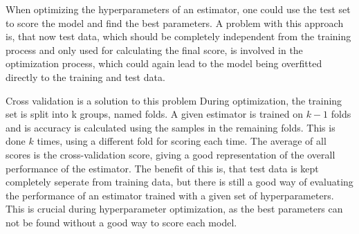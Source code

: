 When optimizing the hyperparameters of an estimator, one could use the test set to score
the model and find the best parameters. A problem with this approach is, that now test data,
which should be completely independent from the training process and only used for calculating
the final score, is involved in the optimization process, which could again lead to the model being
overfitted directly to the training and test data.

Cross validation is a solution to this problem During optimization, the training set is
split into k groups, named folds. A given estimator is trained on $k-1$ folds and is accuracy
is calculated using the samples in the remaining folds. This is done $k$ times, using a different fold
for scoring each time. The average of all scores is the cross-validation score, giving a good
representation of the overall performance of the estimator.
The benefit of this is, that test data is kept completely seperate from training data, but there
is still a good way of evaluating the performance of an estimator trained with a given set
of hyperparameters. This is crucial during hyperparameter optimization, as the best parameters
can not be found without a good way to score each model.




